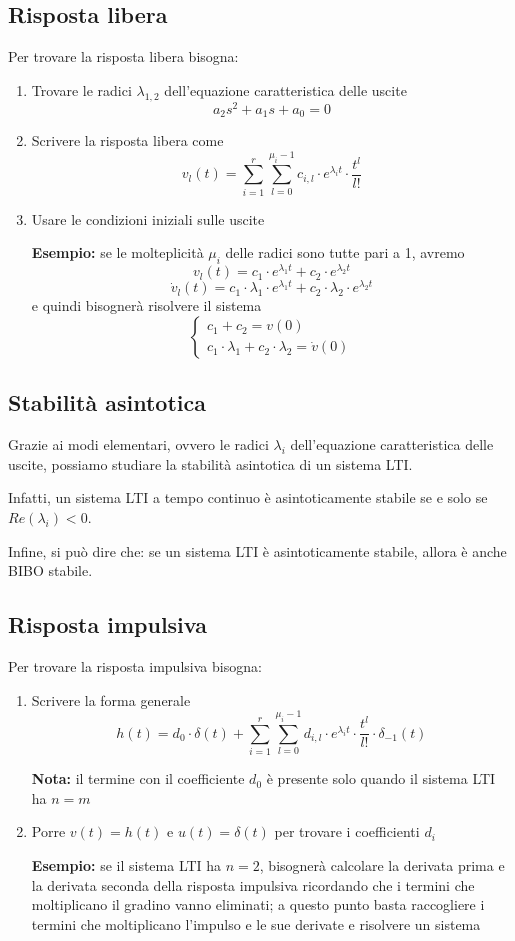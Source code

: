 \documentclass[a4paper,oneside,titlepage]{book}
\begin{document}
\subsection{Risposta libera}
Per trovare la risposta libera bisogna:
\begin{enumerate}
\item Trovare le radici $\lambda_{1,2}$ dell'equazione caratteristica delle uscite
\[ a_2 s^2 + a_1 s + a_0 = 0 \]

\item Scrivere la risposta libera come
\[ v_l(t) = \sum_{i=1}^r \sum_{l=0}^{\mu_i-1} c_{i,l} \cdot e^{\lambda_it} \cdot \frac{t^l}{l!} \]

\item Usare le condizioni iniziali sulle uscite

\textbf{Esempio:}
se le molteplicità $\mu_i$ delle radici sono tutte pari a 1, avremo
\[ v_l(t) = c_1 \cdot e^{\lambda_1t} + c_2 \cdot e^{\lambda_2t} \]
\[ \dot{v}_l(t) = c_1 \cdot \lambda_1 \cdot e^{\lambda_1t} + c_2 \cdot \lambda_2 \cdot e^{\lambda_2t} \]
e quindi bisognerà risolvere il sistema
\[ \begin{cases}
c_1 + c_2 = v(0) \\
c_1 \cdot \lambda_1 + c_2 \cdot \lambda_2 = \dot{v}(0)
\end{cases} \]
\end{enumerate}

\subsection{Stabilità asintotica}
Grazie ai modi elementari, ovvero le radici $\lambda_i$ dell'equazione caratteristica delle uscite, possiamo studiare la stabilità asintotica di un sistema LTI.

Infatti, un sistema LTI a tempo continuo è asintoticamente stabile se e solo se $Re(\lambda_i)<0$.

Infine, si può dire che: se un sistema LTI è asintoticamente stabile, allora è anche BIBO stabile.

\subsection{Risposta impulsiva}
Per trovare la risposta impulsiva bisogna:
\begin{enumerate}
\item Scrivere la forma generale
\[ h(t) = d_0 \cdot \delta(t) + \sum_{i=1}^r \sum_{l=0}^{\mu_i-1} d_{i,l} \cdot e^{\lambda_it} \cdot \frac{t^l}{l!} \cdot \delta_{-1}(t) \]

\textbf{Nota:}
il termine con il coefficiente $d_0$ è presente solo quando il sistema LTI ha $n = m$

\item Porre $v(t) = h(t)$ e $u(t) = \delta(t)$ per trovare i coefficienti $d_i$

\textbf{Esempio:}
se il sistema LTI ha $n=2$, bisognerà calcolare la derivata prima e la derivata seconda della risposta impulsiva ricordando che i termini che moltiplicano il gradino vanno eliminati; a questo punto basta raccogliere i termini che moltiplicano l'impulso e le sue derivate e risolvere un sistema
\end{enumerate}
\end{document}
